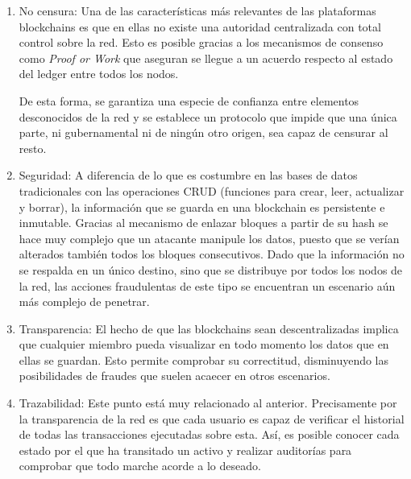 \begin{enumerate}
	\item  No censura: Una de las caracter\'isticas m\'as relevantes de las plataformas blockchains es que en ellas no existe una autoridad centralizada con total control sobre la red. Esto es posible gracias a los mecanismos de consenso como \emph{Proof or Work} que aseguran se llegue a un acuerdo respecto al estado del ledger entre todos los nodos.
	
	De esta forma, se garantiza una especie de confianza entre elementos desconocidos de la red y se establece un protocolo que impide que una \'unica parte, ni gubernamental ni de ning\'un otro origen, sea capaz de censurar al resto.
	
		
	\item Seguridad: A diferencia de lo que es costumbre en las bases de datos tradicionales con las operaciones CRUD (funciones para crear, leer, actualizar y borrar), la informaci\'on que se guarda en una blockchain es persistente e inmutable. Gracias al mecanismo de enlazar bloques a partir de su hash se hace muy complejo que un atacante manipule los datos, puesto que se ver\'ian alterados tambi\'en todos los bloques consecutivos. Dado que la informaci\'on no se respalda en un \'unico destino, sino que se distribuye por todos los nodos de la red, las acciones fraudulentas de este tipo se encuentran un escenario a\'un m\'as complejo de penetrar.
	
	\item Transparencia: El hecho de que las blockchains sean descentralizadas implica que cualquier miembro pueda visualizar en todo momento los datos que en ellas se guardan. Esto permite comprobar su correctitud, disminuyendo las posibilidades de fraudes que suelen acaecer en otros escenarios.
	
	\item Trazabilidad: Este punto est\'a muy relacionado al anterior. Precisamente por la transparencia de la red es que cada usuario es capaz de verificar el historial de todas las transacciones ejecutadas sobre esta. As\'i, es posible conocer cada estado por el que ha transitado un activo y realizar auditor\'ias para comprobar que todo marche acorde a lo deseado.	

\end{enumerate}


